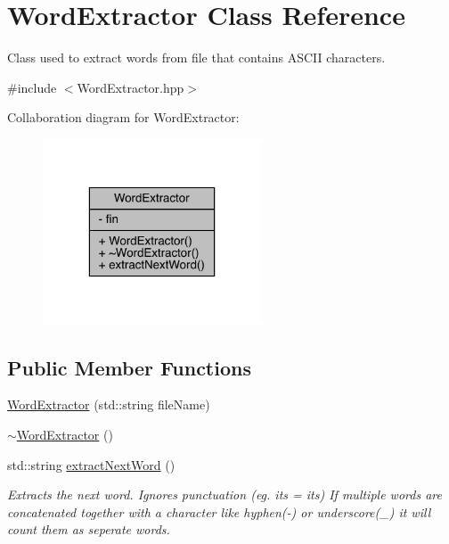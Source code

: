 \hypertarget{class_word_extractor}{}\section{Word\+Extractor Class Reference}
\label{class_word_extractor}


Class used to extract words from file that contains A\+S\+C\+II characters.  




{\ttfamily \#include $<$Word\+Extractor.\+hpp$>$}



Collaboration diagram for Word\+Extractor\+:\nopagebreak
\begin{figure}[H]
\begin{center}
\leavevmode
\includegraphics[width=184pt]{class_word_extractor__coll__graph}
\end{center}
\end{figure}
\subsection*{Public Member Functions}
\begin{DoxyCompactItemize}
\item 
\mbox{\hyperlink{class_word_extractor_ab25413856a41ffa0e47682107ba2d456}{Word\+Extractor}} (std\+::string file\+Name)
\item 
\mbox{\hyperlink{class_word_extractor_a20476de5cb146afd9bc318a629157a9c}{$\sim$\+Word\+Extractor}} ()
\item 
std\+::string \mbox{\hyperlink{class_word_extractor_aae86b87d65bcfe432ec50c88fec4f464}{extract\+Next\+Word}} ()
\begin{DoxyCompactList}\small\item\em Extracts the next word. Ignores punctuation (eg. it\textquotesingle{}s = its) If multiple words are concatenated together with a character like hyphen(-\/) or underscore(\+\_\+) it will count them as seperate words. \end{DoxyCompactList}\end{DoxyCompactItemize}
